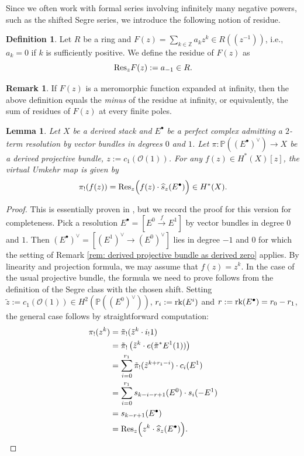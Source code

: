 \documentclass[10pt]{amsart}
\newcommand{\BZ}{\mathbb{Z}}
\newcommand{\BP}{\mathbb{P}}
\newcommand{\CO}{\mathcal{O}}
\newcommand{\+}{{}^+}
\newcommand{\rk}{\textnormal{rk}}
\newcommand{\Res}{\textnormal{Res}}
\newtheorem {lemma}[theorem]{Lemma}
\theoremstyle{definition}
\theoremstyle {definition}
\newtheorem{remark}[theorem]{Remark}
\theoremstyle {definition}
\newtheorem{definition}[theorem]{Definition}
\begin{document}
Since we often work with formal series involving infinitely many negative powers, such as the shifted Segre series, we introduce the following notion of residue.

\begin{definition}
    Let $R$ be a ring and $F(z)=\sum_{k\in \BZ} a_k z^k\in R(\!(z^{-1})\!)$, i.e., $a_k=0$ if $k$ is sufficiently positive. We define the residue of $F(z)$ as
    $$\Res_z F(z):=a_{-1}\in R. 
    $$
\end{definition}
\begin{remark}
    If $F(z)$ is a meromorphic function expanded at infinity, then the above definition equals the {\it minus} of the residue at infinity, or equivalently, the sum of residues of $F(z)$ at every finite poles. 
\end{remark}



\begin{lemma}
\label{lem: virtual pushforward}
    Let $X$ be a derived stack and $E^\bullet$ be a perfect complex admitting a $2$-term resolution by vector bundles in degrees $0$ and $1$. Let $\pi:\BP((E^\bullet)^\vee)\rightarrow X$ be a derived projective bundle, $z:=c_1(\CO(1))$. For any $f(z)\in H^*(X)[z]$, the virtual Umkehr map is given by
    $$\pi_!(f(z))=\Res_z\Big(f(z)\cdot \widehat{s}_z(E^\bullet)\Big)\in H^*(X).
    $$
\end{lemma}

\begin{proof}

This is essentially proven in \cite[eq. (43)]{marian2026cohomologyquotschemesmooth}, but we record the proof for this version for completeness. Pick a resolution $E^\bullet=[E^0\xrightarrow{f}E^1]$ by vector bundles in degree $0$ and $1$. Then $(E^\bullet)^\vee=[(E^1)^\vee\rightarrow (E^0)^\vee]$ lies in degree $-1$ and $0$ for which the setting of Remark \ref{rem: derived projective bundle as derived zero} applies. By linearity and projection formula, we may assume that $f(z)=z^k$. In the case of the usual projective bundle, the formula we need to prove follows from the definition of the Segre class with the chosen shift. Setting $\tilde z:=c_1(\CO(1))\in H^2(\BP((E^0)^\vee))$, $r_i:=\rk(E^i)$ and $r:=\rk(E^\bullet)=r_0-r_1$, the general case follows by straightforward computation:
    \begin{align*}
        \pi_!(z^k)
        &=\tilde \pi_!(\tilde z^k\cdot i_!1)\\
        &=\tilde \pi_!\left(\tilde z^k\cdot e(\tilde\pi^*E^1(1))\right)\\
        &=\sum_{i=0}^{r_1}\tilde \pi_!(\tilde z^{k+r_1-i})\cdot c_i(E^1)\\
        &=\sum_{i=0}^{r_1}s_{k-i-r+1}(E^0)\cdot s_i(-E^1)\\
        &=s_{k-r+1}(E^\bullet)\\
        &=\Res_z\Big(z^k\cdot \widehat s_z(E^\bullet)\Big).
    \end{align*}
\end{proof}
\end{document}
